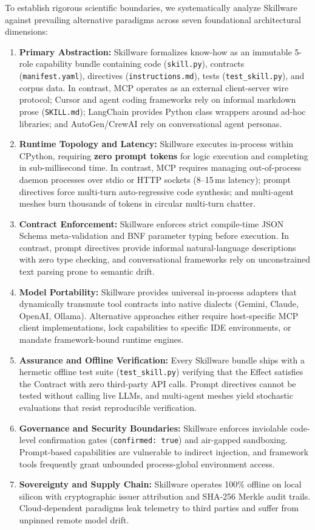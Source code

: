 To establish rigorous scientific boundaries, we systematically analyze Skillware against prevailing alternative paradigms across seven foundational architectural dimensions:
\begin{enumerate}[leftmargin=*]
  \item \textbf{Primary Abstraction:} Skillware formalizes know-how as an immutable 5-role capability bundle containing code (\texttt{skill.py}), contracts (\texttt{manifest.yaml}), directives (\texttt{instructions.md}), tests (\texttt{test\_skill.py}), and corpus data. In contrast, MCP operates as an external client-server wire protocol; Cursor and agent coding frameworks rely on informal markdown prose (\texttt{SKILL.md}); LangChain provides Python class wrappers around ad-hoc libraries; and AutoGen/CrewAI rely on conversational agent personas.
  \item \textbf{Runtime Topology and Latency:} Skillware executes in-process within CPython, requiring \textbf{zero prompt tokens} for logic execution and completing in sub-millisecond time. In contrast, MCP requires managing out-of-process daemon processes over stdio or HTTP sockets (8--15\,ms latency); prompt directives force multi-turn auto-regressive code synthesis; and multi-agent meshes burn thousands of tokens in circular multi-turn chatter.
  \item \textbf{Contract Enforcement:} Skillware enforces strict compile-time JSON Schema meta-validation and BNF parameter typing before execution. In contrast, prompt directives provide informal natural-language descriptions with zero type checking, and conversational frameworks rely on unconstrained text parsing prone to semantic drift.
  \item \textbf{Model Portability:} Skillware provides universal in-process adapters that dynamically transmute tool contracts into native dialects (Gemini, Claude, OpenAI, Ollama). Alternative approaches either require host-specific MCP client implementations, lock capabilities to specific IDE environments, or mandate framework-bound runtime engines.
  \item \textbf{Assurance and Offline Verification:} Every Skillware bundle ships with a hermetic offline test suite (\texttt{test\_skill.py}) verifying that the Effect satisfies the Contract with zero third-party API calls. Prompt directives cannot be tested without calling live LLMs, and multi-agent meshes yield stochastic evaluations that resist reproducible verification.
  \item \textbf{Governance and Security Boundaries:} Skillware enforces inviolable code-level confirmation gates (\texttt{confirmed: true}) and air-gapped sandboxing. Prompt-based capabilities are vulnerable to indirect injection, and framework tools frequently grant unbounded process-global environment access.
  \item \textbf{Sovereignty and Supply Chain:} Skillware operates 100\% offline on local silicon with cryptographic issuer attribution and SHA-256 Merkle audit trails. Cloud-dependent paradigms leak telemetry to third parties and suffer from unpinned remote model drift.
\end{enumerate}

